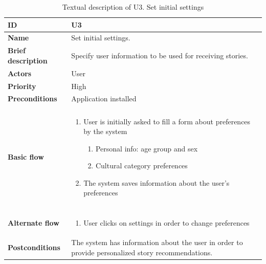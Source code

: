\begin{table}[hp]
	\renewcommand{\arraystretch}{1.5}
	\centering
	\caption{Textual description of U3. Set initial settings}
	\begin{tabular}[b]{|l | p{13cm}|}\hline
		\textbf{ID} 				& U3									\\\hline
		\textbf{Name} 				& Set initial settings.					\\\hline
		\textbf{Brief description}	& Specify user information to be used for receiving stories. \\\hline
		\textbf{Actors} 			& User									\\\hline
		\textbf{Priority}			& High									\\\hline
		\textbf{Preconditions}		& Application installed					\\\hline&\\[-2ex]
		\textbf{Basic flow}			& \begin{minipage}{5in}
			\begin{enumerate}[noitemsep]
				\item User is initially asked to fill a form about preferences by the system
					\begin{enumerate}
						\item Personal info: age group and sex
						\item Cultural category preferences
					\end{enumerate}
				\item The system saves information about the user’s preferences
			\end{enumerate}						
		\end{minipage}						\\\hline&\\[-2ex]
		\textbf{Alternate flow}		& \begin{minipage}{5in}
			\begin{enumerate}[noitemsep]
				\item User clicks on settings in order to change preferences
			\end{enumerate}
		\end{minipage}							\\\hline
		\textbf{Postconditions}		& The system has information about the user in order to provide personalized story recommendations.\\\hline
	\end{tabular}
	\label{Tab:U3}
\end{table}

